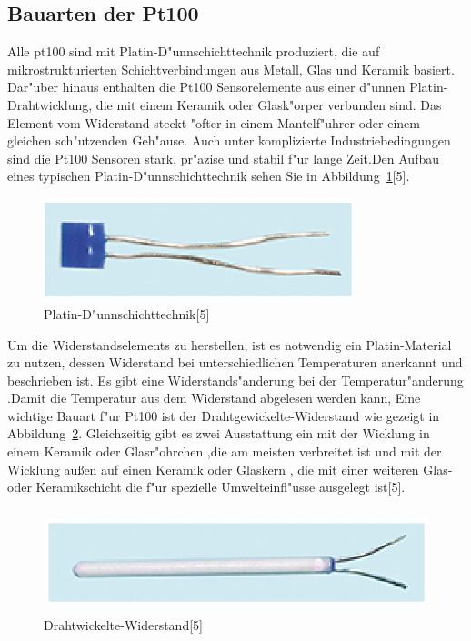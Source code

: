  \subsection{Bauarten der Pt100}
 
 Alle pt100 sind mit Platin-D"unnschichttechnik produziert, 
 die auf mikrostrukturierten Schichtverbindungen aus Metall, 
 Glas und Keramik basiert. Dar"uber hinaus enthalten die Pt100  
 Sensorelemente aus einer d"unnen Platin-Drahtwicklung, 
 die mit einem Keramik oder Glask"orper verbunden sind.
 Das Element vom Widerstand steckt "ofter in einem Mantelf"uhrer 
 oder einem gleichen sch"utzenden Geh"ause. Auch unter komplizierte 
 Industriebedingungen sind die Pt100 Sensoren stark,
 pr"azise und stabil f"ur lange Zeit.Den Aufbau eines typischen Platin-D"unnschichttechnik
 sehen Sie in Abbildung~\ref{fig:pla}[5].

 
 \begin{figure}[!htb]
\begin{center}
\includegraphics[height=3cm]{bilder/pla.eps}
\end{center}
\caption{Platin-D"unnschichttechnik[5]}\label{fig:pla}
\end{figure}
 
 Um die Widerstandselements zu herstellen, 
 ist es notwendig ein Platin-Material zu nutzen, 
 dessen Widerstand bei unterschiedlichen Temperaturen anerkannt 
 und beschrieben ist. Es gibt eine Widerstands"anderung bei 
 der Temperatur"anderung .Damit die Temperatur aus dem 
 Widerstand abgelesen werden kann,
Eine wichtige Bauart f"ur Pt100  ist der Drahtgewickelte-Widerstand 
wie gezeigt in Abbildung~\ref{fig:dra}. 
Gleichzeitig gibt es zwei Ausstattung  ein mit der Wicklung in einem 
Keramik oder Glasr"ohrchen ,die am meisten verbreitet ist und 
mit der Wicklung außen auf einen Keramik oder Glaskern ,
die mit einer weiteren Glas- oder Keramikschicht  
die f"ur spezielle Umwelteinfl"usse ausgelegt ist[5].

\begin{figure}[!htb]
\begin{center}
\includegraphics[height=3cm]{bilder/dra.eps}
\end{center}
\caption{Drahtwickelte-Widerstand[5]}\label{fig:dra}
\end{figure}

